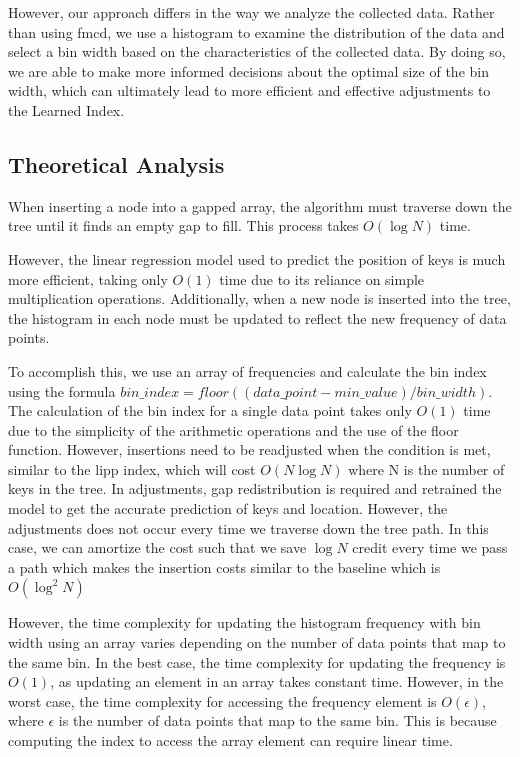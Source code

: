 \documentclass[11pt,a4paper]{article}
\newcommand{\learnindex}{\textsf{Learned Index}\xspace}
\begin{document}
However, our approach differs in the way we analyze the collected data. Rather than using \acrfull{fmcd}\cite{LIPP}, we use a histogram to examine the distribution of the data and select a bin width based on the characteristics of the collected data.  By doing so, we are able to make more informed decisions about the optimal size of the bin width, which can ultimately lead to more efficient and effective adjustments to the \learnindex.




\subsection{Theoretical Analysis}
When inserting a node into a gapped array, the algorithm must traverse down the tree until it finds an empty gap to fill. This process takes $O(\log N)$ time.

However, the linear regression model used to predict the position of keys is much more efficient, taking only $O(1)$ time due to its reliance on simple multiplication operations. Additionally, when a new node is inserted into the tree, the histogram in each node must be updated to reflect the new frequency of data points.

To accomplish this, we use an array of frequencies and calculate the bin index using the formula $bin\_index = floor((data\_point - min\_value) / bin\_width)$. The calculation of the bin index for a single data point takes only $O(1)$ time due to the simplicity of the arithmetic operations and the use of the floor function. However, insertions need to be readjusted when the condition is met, similar to the \acrshort{lipp} index, which will cost $O(N\log N)$ where N is the number of keys in the tree. In adjustments, gap redistribution is required and retrained the model to get the accurate prediction of keys and location. However, the adjustments does not occur every time we traverse down the tree path. In this case, we can amortize the cost such that we save $\log N$ credit every time we pass a path which makes the insertion costs similar to the baseline which is $O(\log^2 N)$

However, the time complexity for updating the histogram frequency with bin width using an array varies depending on the number of data points that map to the same bin. In the best case, the time complexity for updating the frequency is $O(1)$, as updating an element in an array takes constant time. However, in the worst case, the time complexity for accessing the frequency element is $O(\epsilon)$, where $\epsilon$ is the number of data points that map to the same bin. This is because computing the index to access the array element can require linear time.
\end{document}
